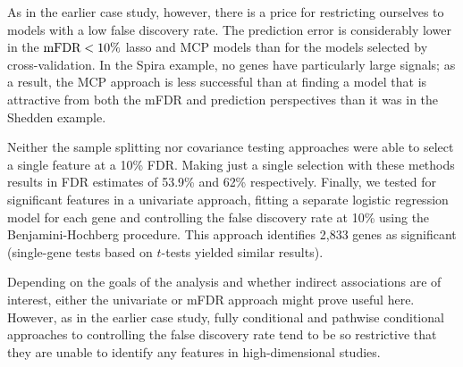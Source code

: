 
As in the earlier case study, however, there is a price for restricting ourselves to models with a low false discovery rate.  The prediction error is considerably lower in the $\textrm{mFDR} < 10\%$ lasso and MCP models than for the models selected by cross-validation.  In the Spira example, no genes have particularly large signals; as a result, the MCP approach is less successful than at finding a model that is attractive from both the mFDR and prediction perspectives than it was in the Shedden example.

Neither the sample splitting nor covariance testing approaches were able to select a single feature at a 10\% FDR. Making just a single selection with these methods results in FDR estimates of 53.9\% and 62\% respectively.
Finally, we tested for significant features in a univariate approach, fitting a separate logistic regression model for each gene and controlling the false discovery rate at 10\% using the Benjamini-Hochberg procedure.
This approach identifies 2,833 genes as significant (single-gene tests based on $t$-tests yielded similar results).

Depending on the goals of the analysis and whether indirect associations are of interest, either the univariate or mFDR approach might prove useful here.
However, as in the earlier case study, fully conditional and pathwise conditional approaches to controlling the false discovery rate tend to be so restrictive that they are unable to identify any features in high-dimensional studies.

